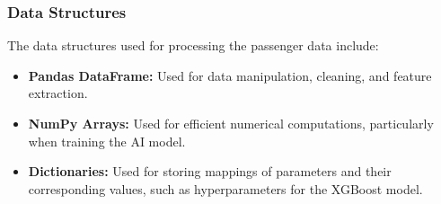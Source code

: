 \documentclass[15pt]{article}
\begin{document}
\subsubsection{Data Structures}
The data structures used for processing the passenger data include:
\begin{itemize}
    \item \textbf{Pandas DataFrame:} Used for data manipulation, cleaning, and feature extraction.
    \item \textbf{NumPy Arrays:} Used for efficient numerical computations, particularly when training the AI model.
    \item \textbf{Dictionaries:} Used for storing mappings of parameters and their corresponding values, such as hyperparameters for the XGBoost model.
\end{itemize}
\end{document}
